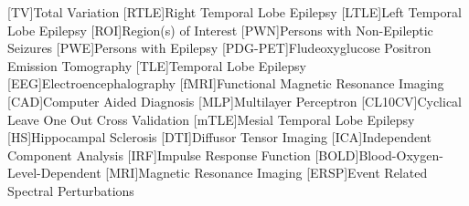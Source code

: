 \documentclass{article}
\title{\vspace{-15ex }}
\date{}
\begin{document}
[TV]{Total Variation}
[RTLE]{Right Temporal Lobe Epilepsy}
[LTLE]{Left Temporal Lobe Epilepsy}
[ROI]{Region(s) of Interest}
[PWN]{Persons with Non-Epileptic Seizures}
[PWE]{Persons with Epilepsy}
[PDG-PET]{Fludeoxyglucose Positron Emission Tomography}
[TLE]{Temporal Lobe Epilepsy}
[EEG]{Electroencephalography}
[fMRI]{Functional Magnetic Resonance Imaging}
[CAD]{Computer Aided Diagnosis}
[MLP]{Multilayer Perceptron}
[CL10CV]{Cyclical Leave One Out Cross Validation}
[mTLE]{Mesial Temporal Lobe Epilepsy}
[HS]{Hippocampal Sclerosis}
[DTI]{Diffusor Tensor Imaging}
[ICA]{Independent Component Analysis}
[IRF]{Impulse Response Function}
[BOLD]{Blood-Oxygen-Level-Dependent}
[MRI]{Magnetic Resonance Imaging}
[ERSP]{Event Related Spectral Perturbations}

\maketitle


\nocite{*}
\end{document}
